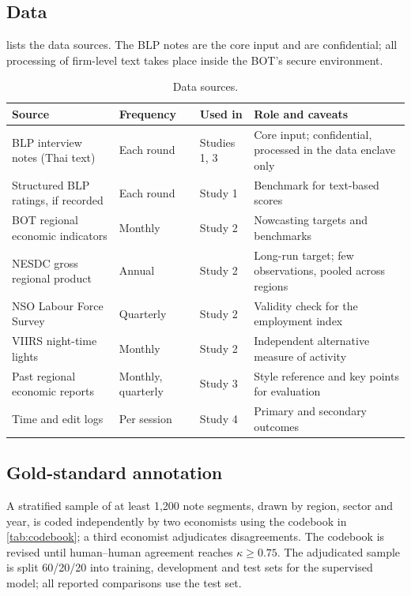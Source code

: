 \documentclass[11pt]{article}
\begin{document}
\subsection{Data}
 lists the data sources. The BLP notes are the core input and are confidential; all processing of firm-level text takes place inside the BOT's secure environment.

\begin{table}[tbp]
\centering\small
\caption{Data sources.}\label{tab:data}
\begin{tabularx}{\textwidth}{@{}L{4.2cm}L{2.0cm}L{1.9cm}Y@{}}
\toprule
Source & Frequency & Used in & Role and caveats \\
\midrule
BLP interview notes (Thai text) & Each round & Studies 1, 3 & Core input; confidential, processed in the data enclave only \\
Structured BLP ratings, if recorded & Each round & Study 1 & Benchmark for text-based scores \\
BOT regional economic indicators & Monthly & Study 2 & Nowcasting targets and benchmarks \\
NESDC gross regional product & Annual & Study 2 & Long-run target; few observations, pooled across regions \\
NSO Labour Force Survey & Quarterly & Study 2 & Validity check for the employment index \\
VIIRS night-time lights & Monthly & Study 2 & Independent alternative measure of activity \\
Past regional economic reports & Monthly, quarterly & Study 3 & Style reference and key points for evaluation \\
Time and edit logs & Per session & Study 4 & Primary and secondary outcomes \\
\bottomrule
\end{tabularx}
\end{table}

\subsection{Gold-standard annotation}
A stratified sample of at least 1{,}200 note segments, drawn by region, sector and year, is coded independently by two economists using the codebook in \cref{tab:codebook}; a third economist adjudicates disagreements. The codebook is revised until human--human agreement reaches $\kappa \geq 0.75$. The adjudicated sample is split 60/20/20 into training, development and test sets for the supervised model; all reported comparisons use the test set.
\end{document}
